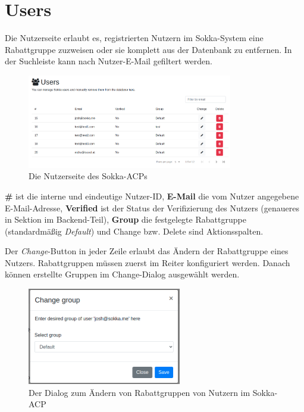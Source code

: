 \section{Users}

Die Nutzerseite erlaubt es, registrierten Nutzern im Sokka-System eine Rabattgruppe zuzweisen oder sie komplett aus der Datenbank zu entfernen. In der Suchleiste kann nach Nutzer-E-Mail gefiltert werden.

\begin{figure}[ht]
    \centering
    \includegraphics[width=0.8\textwidth]{images/ACP/users-page.png}
    \caption{Die Nutzerseite des Sokka-ACPs}
\end{figure}

\textbf{\#} ist die interne und eindeutige Nutzer-ID, \textbf{E-Mail} die vom Nutzer angegebene E-Mail-Adresse, \textbf{Verified} ist der Status der Verifizierung des Nutzers (genaueres in Sektion \textit{\glqq{}\grqq} im Backend-Teil), \textbf{Group} die festgelegte Rabattgruppe (standardmäßig \textit{Default}) und Change bzw. Delete sind Aktionsspalten.

Der \textit{Change}-Button in jeder Zeile erlaubt das Ändern der Rabattgruppe eines Nutzers. Rabattgruppen müssen zuerst im Reiter \textit{\glqq{}\grqq} konfiguriert werden. Danach können erstellte Gruppen im Change-Dialog ausgewählt werden.

\begin{figure}[ht]
    \centering
    \includegraphics[width=0.6\textwidth]{images/ACP/users_modal.png}
    \caption{Der Dialog zum Ändern von Rabattgruppen von Nutzern im Sokka-ACP}
\end{figure}